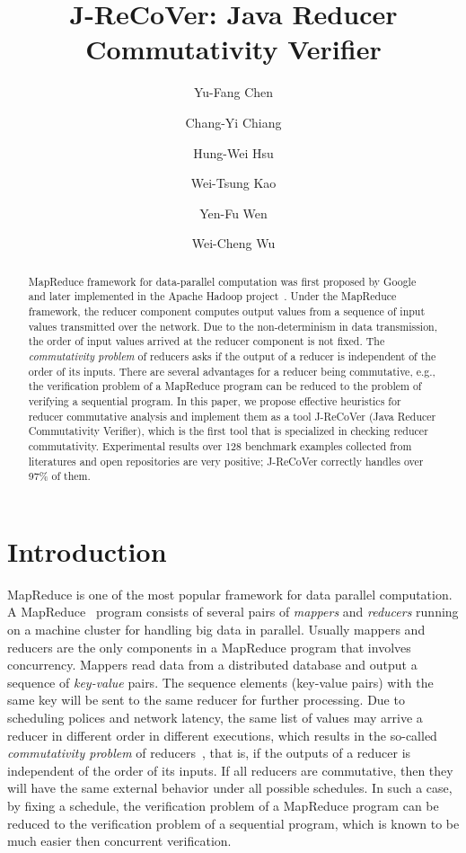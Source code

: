 \documentclass{llncs}
\title{J-ReCoVer: Java Reducer Commutativity Verifier}
\author{
Yu-Fang Chen\inst{1}\inst{2}
\and
Chang-Yi Chiang\inst{2}
\and
Hung-Wei Hsu\inst{1}
\and
Wei-Tsung Kao\inst{1}
\and
Yen-Fu Wen\inst{2}
\and
Wei-Cheng Wu\inst{1}
}
\institute
{
Institute of Information Science, Academia Sinica, Taiwan
\and
Graduate Institute of Information Management, National Taipei University, Taiwan
}
\begin{document}
\maketitle

\begin{abstract}
	
MapReduce framework for data-parallel computation was first proposed by Google~\cite{dean04} and later implemented in the Apache Hadoop project~\cite{hadoop}.
Under the MapReduce framework, the reducer component computes output values from a sequence of input values transmitted over the network.  Due to the non-determinism in data transmission, the order of input values arrived at the reducer component is not fixed.
The \emph{commutativity problem} of reducers asks if the output of a reducer is independent of the order of its inputs. There are several advantages for a reducer being commutative, e.g., the verification problem of a MapReduce program can be reduced to the problem of verifying a sequential program. 
In this paper, we propose effective heuristics for reducer commutative analysis and implement them as a tool J-ReCoVer (Java Reducer Commutativity Verifier), which is the first tool that is specialized in checking reducer commutativity. Experimental results over 128 benchmark examples collected from literatures and open repositories are very positive; J-ReCoVer correctly handles over 97\% of them.


\end{abstract}

\section{Introduction}
\label{section:introduction}

MapReduce is one of the most popular framework for data parallel computation.
A MapReduce~\cite{dean04,hadoop} program consists of several pairs of \emph{mappers} and \emph{reducers} running on a machine cluster for handling big data in parallel. Usually mappers and reducers are the only components in a MapReduce program that involves concurrency. Mappers read data from a distributed database and output a sequence of \emph{key-value} pairs. The sequence elements (key-value pairs) with the same key will be sent to the same reducer for further processing. Due to scheduling polices and network latency, the same list of values may arrive a reducer in different order in different executions, which results in the so-called \emph{commutativity problem} of reducers~\cite{csallner13testing,xiao14mr,ChenHSW15,ChenSW16}, that is, if the outputs of a reducer is independent of the order of its inputs. 
If all reducers are commutative, then they will have the same external behavior under all possible schedules. In such a case, by fixing a schedule, the verification problem of a MapReduce program can be reduced to the verification problem of a sequential program, which is known to be much easier then concurrent verification. 
\end{document}
